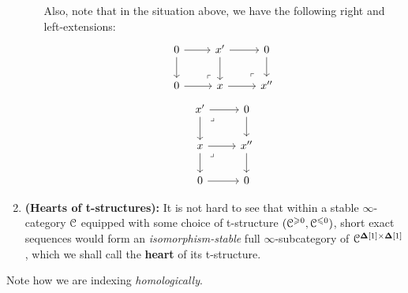 \begin{definition}[t-structures]
\begin{enumerate}
\begin{enumerate}
                        Also, note that in the situation above, we have the following right and left-extensions:
                            $$
                                \begin{tikzcd}
                                    0 & {x'} & 0 \\
                                    0 & x & {x''}
                                    \arrow[from=1-3, to=2-3]
                                    \arrow[from=2-2, to=2-3]
                                    \arrow[from=1-2, to=2-2]
                                    \arrow[from=1-2, to=1-3]
                                    \arrow["\lrcorner"{anchor=center, pos=0.125, rotate=180}, draw=none, from=2-3, to=1-2]
                                    \arrow[from=1-1, to=2-1]
                                    \arrow[from=2-1, to=2-2]
                                    \arrow[from=1-1, to=1-2]
                                    \arrow["\lrcorner"{anchor=center, pos=0.125, rotate=180}, draw=none, from=2-2, to=1-1]
                                \end{tikzcd}
                            $$
                            $$
                                \begin{tikzcd}
                                    {x'} & 0 \\
                                    x & {x''} \\
                                    0 & 0
                                    \arrow[from=1-2, to=2-2]
                                    \arrow[from=2-1, to=2-2]
                                    \arrow[from=1-1, to=2-1]
                                    \arrow[from=1-1, to=1-2]
                                    \arrow["\lrcorner"{anchor=center, pos=0.125}, draw=none, from=1-1, to=2-2]
                                    \arrow[from=2-2, to=3-2]
                                    \arrow[from=2-1, to=3-1]
                                    \arrow[from=3-1, to=3-2]
                                    \arrow["\lrcorner"{anchor=center, pos=0.125}, draw=none, from=2-1, to=3-2]
                                \end{tikzcd}
                            $$
                    \end{enumerate}
                \item \textbf{(Hearts of t-structures):} It is not hard to see that within a stable $\infty$-category $\mathcal{C}$ equipped with some choice of t-structure $(\mathcal{C}^{\geqslant 0}, \mathcal{C}^{\leqslant 0})$, short exact sequences would form an \textit{isomorphism-stable} full $\infty$-subcategory of $\C^{\simp[1] \x \simp[1]}$, which we shall call the \textbf{heart} of its t-structure. 
            \end{enumerate}
            Note how we are indexing \textit{homologically}.
        \end{definition}
